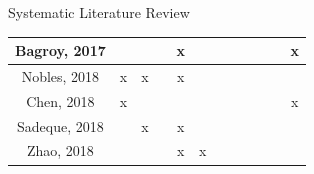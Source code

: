 \documentclass[aspectratio=169,10pt,xcolor={dvipsnames}]{beamer}
\begin{document}
\begin{frame}{Systematic Literature Review}
\begin{table}[]
{\begin{tabular}{c|c|c|c|c|c|c|ccc|c|c}
    Bagroy, 2017 \cite{Bagroy:2017:SMB:3025453.3025909}           &                                                                 &                   &                & x              &                                                                     &                       & \multicolumn{1}{c|}{}                  & \multicolumn{1}{c|}{}                                                               &               &                                                                  & x                                                                       \\ \hline
    Nobles, 2018 \cite{Nobles:2018:IIS:3173574.3173987}           & x                                                               & x                 &                & x              &                                                                     &                       & \multicolumn{1}{c|}{}                  & \multicolumn{1}{c|}{}                                                               &               &                                                                  &                                                                         \\ \hline
    Chen, 2018 \cite{Chen2018}                                    & x                                                               &                   &                &                &                                                                     &                       & \multicolumn{1}{c|}{}                  & \multicolumn{1}{c|}{}                                                               &               &                                                                  & x                                                                       \\ \hline
    Sadeque, 2018 \cite{Sadeque2018}                              &                                                                 & x                 &                & x              &                                                                     &                       & \multicolumn{1}{c|}{}                  & \multicolumn{1}{c|}{}                                                               &               &                                                                  &                                                                         \\ \hline
    Zhao, 2018 \cite{Zhao:2018:TCM:3302425.3302501}               &                                                                 &                   &                & x              & x                                                                   &                       & \multicolumn{1}{c|}{}                  & \multicolumn{1}{c|}{}                                                               &               &                                                                  &                                                                        


\end{tabular}}
\end{table}
\end{frame}
\end{document}
